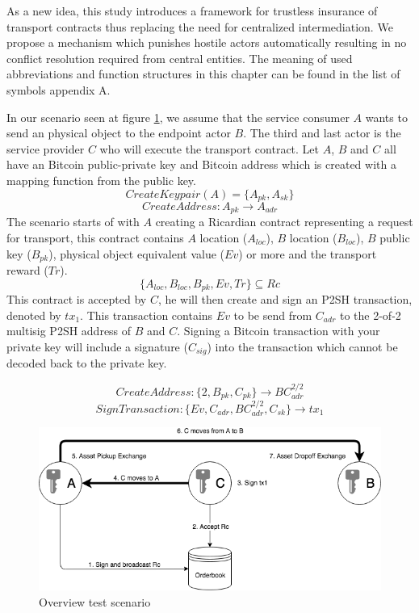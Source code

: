 As a new idea, this study introduces a framework for trustless insurance of transport contracts thus replacing the need for centralized intermediation. We propose a mechanism which punishes hostile actors automatically resulting in no conflict resolution required from central entities. The meaning of used abbreviations and function structures in this chapter can be found in the list of symbols appendix A.\par
In our scenario seen at figure \ref{fig:1 main overview}, we assume that the service consumer $A$ wants to send an physical object to the endpoint actor $B$. The third and last actor is the service provider $C$ who will execute the transport contract. Let $A$, $B$ and $C$ all have an Bitcoin public-private key and Bitcoin address which is created with a mapping function from the public key.
\[CreateKeypair(A) = \{A_{pk}, A_{sk}\}\]
\[CreateAddress \colon A_{pk} \rightarrow A_{adr}\]
The scenario starts of with $A$ creating a Ricardian contract representing a request for transport, this contract contains $A$ location ($A_{loc}$), $B$ location ($B_{loc}$), $B$ public key ($B_{pk}$), physical object equivalent value ($Ev$) or more and the transport reward ($Tr$).
\[\{A_{loc}, B_{loc}, B_{pk}, Ev, Tr\} \subseteq Rc\]
This contract is accepted by $C$, he will then create and sign an P2SH transaction, denoted by $tx_1$. This transaction contains $Ev$ to be send from $C_{adr}$ to the 2-of-2 multisig P2SH address of $B$ and $C$. Signing a Bitcoin transaction with your private key will include a signature ($C_{sig}$) into the transaction which cannot be decoded back to the private key.

\[CreateAddress \colon \{2, B_{pk}, C_{pk}\} \rightarrow BC_{adr}^{2/2}\]
\[SignTransaction \colon \{Ev, C_{adr}, BC_{adr}^{2/2}, C_{sk}\} \rightarrow tx_1\]

\begin{figure}[h]
\centering
\includegraphics[width=1\textwidth]{images/main.png}
\caption{Overview test scenario}
\label{fig:1 main overview}
\end{figure}

